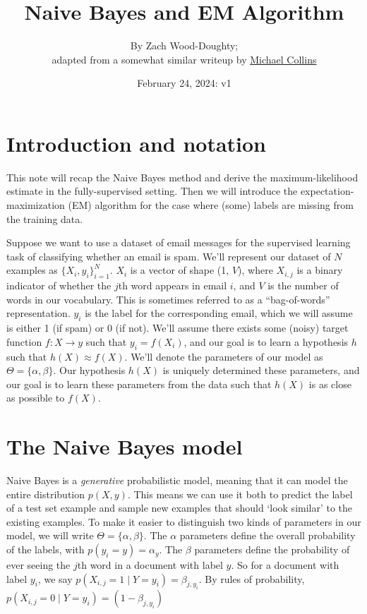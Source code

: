 \documentclass[12pt]{article}
\title{\vspace{-2cm}Naive Bayes and EM Algorithm}
\author{By Zach Wood-Doughty;\\ adapted from
a somewhat similar writeup by \href{http://www.cs.columbia.edu/~mcollins/em.pdf}{Michael
Collins}}
\date{February 24, 2024: v1}
\begin{document}
\maketitle

\section{Introduction and notation}

This note will recap the Naive Bayes method and derive the maximum-likelihood
estimate in the fully-supervised setting. Then we will introduce the
expectation-maximization (EM) algorithm for the case where (some) labels are
missing from the training data.

Suppose we want to use a dataset of email messages for the supervised learning
task of classifying whether an email is spam. We'll represent our dataset of
$N$ examples as $\{X_i, y_i\}_{i=1}^N$. $X_i$ is a vector of shape (1, $V$),
where $X_{i, j}$ is a binary indicator of whether the $j$th word appears in
email $i$, and $V$ is the number of words in our vocabulary. This is sometimes
referred to as a ``bag-of-words'' representation. $y_i$ is the label for the
corresponding email, which we will assume is either 1 (if spam) or 0 (if not).
We'll assume there exists some (noisy) target function $f: X \to y$ such that
$y_i = f(X_i)$, and our goal is to learn a hypothesis $h$ such that $h(X)
\approx f(X)$. We'll denote the parameters of our model as $\Theta = \{\alpha,
\beta\}$.  Our hypothesis $h(X)$ is uniquely determined these parameters, and
our goal is to learn these parameters from the data such that $h(X)$ is as
close as possible to $f(X)$.

\section{The Naive Bayes model}

Naive Bayes is a {\it generative} probabilistic model, meaning that it can
model the entire distribution $p(X, y)$. This means we can use it both to
predict the label of a test set example and sample new examples that should
`look similar' to the existing examples. To make it easier to distinguish two
kinds of parameters in our model, we will write $\Theta = \{\alpha, \beta\}$.
The $\alpha$ parameters define the overall probability of the labels, with
$p(y_i = y) = \alpha_y$. The $\beta$ parameters define the probability of ever
seeing the $j$th word in a document with label $y$. So for a document with
label $y_i$, we say $p(X_{i, j}=1 \mid Y=y_i) = \beta_{j, y_i}$. By rules of
probability, $p(X_{i, j}=0 \mid Y=y_i) = (1 - \beta_{j, y_i})$
\end{document}
